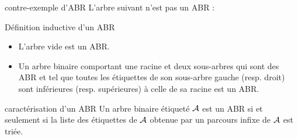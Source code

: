 \begin{exemple}{7.26}{contre-exemple d'ABR}
    L'arbre suivant n'est pas un ABR :
    \begin{center}
\end{center}
   
\end{exemple}

\begin{remarque}{7.27}{Définition inductive d'un ABR}
    \begin{itemize}
        \item L'arbre vide est un ABR.
        \item Un arbre binaire comportant une racine et deux sous-arbres qui sont des ABR et tel que toutes les étiquettes de son sous-arbre gauche (resp. droit) sont inférieures (resp. supérieures) à celle de sa racine est un ABR.
    \end{itemize}
\end{remarque}

\begin{proposition}{7.28}{caractérisation d'un ABR}
    Un arbre binaire étiqueté $\mathcal{A}$ est un ABR si et seulement si la liste des étiquettes de $\mathcal{A}$ obtenue par un parcours infixe de $\mathcal{A}$ est triée.
\end{proposition}

